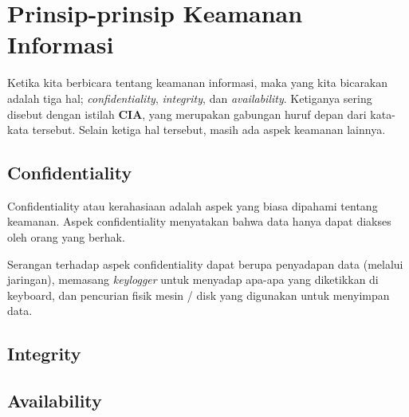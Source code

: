 \chapter{Prinsip-prinsip Keamanan Informasi}
Ketika kita berbicara tentang keamanan informasi, maka yang kita
bicarakan adalah tiga hal;
{\em confidentiality}, {\em integrity}, dan {\em availability}.
Ketiganya sering disebut dengan istilah \textbf{CIA},
yang merupakan gabungan huruf depan dari kata-kata tersebut.
Selain ketiga hal tersebut, masih ada aspek keamanan lainnya.

\section{Confidentiality}
Confidentiality atau kerahasiaan adalah aspek yang biasa dipahami
tentang keamanan.
Aspek confidentiality menyatakan bahwa data hanya dapat diakses
oleh orang yang berhak.

Serangan terhadap aspek confidentiality dapat berupa
penyadapan data (melalui jaringan),
memasang {\em keylogger} untuk menyadap apa-apa yang diketikkan
di keyboard,
dan pencurian fisik mesin / disk yang digunakan untuk menyimpan data.


\section{Integrity}

\section{Availability}
